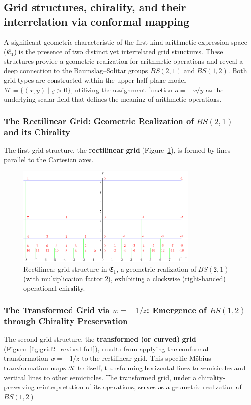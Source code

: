 \documentclass[12pt]{article}
\begin{document}
\subsection{Grid structures, chirality, and their interrelation via conformal mapping}\label{subsec:grids_revised-full}

A significant geometric characteristic of the first kind arithmetic expression space ($\mathfrak{E}_1$) is the presence of two distinct yet interrelated grid structures. These structures provide a geometric realization for arithmetic operations and reveal a deep connection to the Baumslag--Solitar groups $BS(2,1)$ and $BS(1,2)$. Both grid types are constructed within the upper half-plane model $\mathcal{H} = \{(x,y) \mid y>0\}$, utilizing the assignment function $a = -x/y$ as the underlying scalar field that defines the meaning of arithmetic operations.

\subsubsection{The Rectilinear Grid: Geometric Realization of $BS(2,1)$ and its Chirality}

The first grid structure, the \textbf{rectilinear grid} (Figure~\ref{fig:grid1_revised-full}), is formed by lines parallel to the Cartesian axes.

\begin{figure}[ht]
\centering
\includegraphics[width=0.8\textwidth]{images/01-grid-example-1.pdf}
\caption{Rectilinear grid structure in $\mathfrak{E}_1$, a geometric realization of $BS(2,1)$ (with multiplication factor 2), exhibiting a clockwise (right-handed) operational chirality.}\label{fig:grid1_revised-full}
\end{figure}

\subsubsection{The Transformed Grid via $w = -1/z$: Emergence of $BS(1,2)$ through Chirality Preservation}
The second grid structure, the \textbf{transformed (or curved) grid} (Figure~\ref{fig:grid2_revised-full}), results from applying the conformal transformation $w = -1/z$ to the rectilinear grid. This specific M\"obius transformation maps $\mathcal{H}$ to itself, transforming horizontal lines to semicircles and vertical lines to other semicircles. The transformed grid, under a chirality-preserving reinterpretation of its operations, serves as a geometric realization of \textbf{$BS(1,2)$}.
\end{document}
